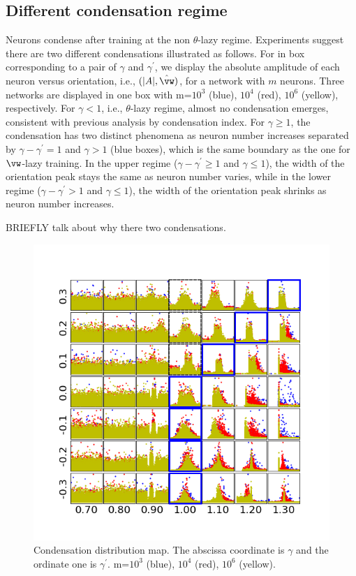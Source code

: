 \documentclass{article}
\begin{document}
\subsection{Different condensation regime}
Neurons condense after training at the non $\theta$-lazy regime. Experiments suggest there are two different condensations illustrated as follows. For in box corresponding to a pair of $\gamma$ and $\gamma^{\prime}$, we display the absolute amplitude of each neuron versus orientation, i.e., $(|A|,\hat{\vw})$, for a network with $m$ neurons. Three networks are displayed in one box with  m=$10^{3}$ (blue), $10^{4}$ (red), $10^{6}$ (yellow), respectively. For $\gamma<1$, i.e., $\theta$-lazy regime, almost no condensation emerges, consistent with previous analysis by condensation index. For $\gamma\geq1$, the condensation has two distinct phenomena as neuron number increases separated by $\gamma-\gamma^{\prime}=1$ and $\gamma>1$ (blue boxes), which is the same boundary as the one for $\vw$-lazy training. In the upper regime ($\gamma-\gamma^{\prime}\geq1$ and $\gamma\leq1$), the width of the orientation peak stays the same as neuron number varies, while in the lower regime ($\gamma-\gamma^{\prime}>1$ and $\gamma\leq1$), the width of the orientation peak shrinks as neuron number increases.

BRIEFLY talk about why there two condensations.


\begin{figure}
    \begin{centering}
        \includegraphics[scale=0.8]{pic/systemexplarg3/scalestudy3/angleamptogether.png}
        \par\end{centering}
    \caption{Condensation distribution map. The abscissa coordinate is $\gamma$ and the ordinate one is $\gamma^{\prime}$. m=$10^{3}$ (blue), $10^{4}$ (red), $10^{6}$ (yellow).\label{fig:cdnmap} }
\end{figure}
\end{document}
